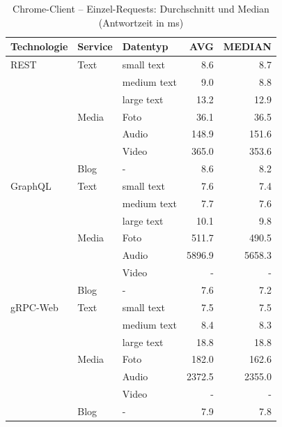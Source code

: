 \begin{table}[h]
	\centering
	\caption{Chrome-Client – Einzel-Requests: Durchschnitt und Median (Antwortzeit in ms)}
	\label{tab:chrome-single-avg}
	\renewcommand{\arraystretch}{1.1}
	\begin{tabular}{|l|l|l|r|r|}
		\hline
		\textbf{Technologie} & \textbf{Service} & \textbf{Datentyp} & \textbf{AVG} & \textbf{MEDIAN} \\
		\hline
		REST & Text  & small text  & 8.6 & 8.7 \\
		&       & medium text & 9.0 & 8.8 \\
		&       & large text  & 13.2 & 12.9 \\
		& Media & Foto        & 36.1 & 36.5 \\
		&       & Audio       & 148.9 & 151.6 \\
		&       & Video       & 365.0 & 353.6 \\
		& Blog  & -           & 8.6 & 8.2 \\
		\hline
		GraphQL & Text  & small text  & 7.6 & 7.4 \\
		&       & medium text & 7.7 & 7.6 \\
		&       & large text  & 10.1 & 9.8 \\
		& Media & Foto        & 511.7 & 490.5 \\
		&       & Audio       & 5896.9 & 5658.3 \\
		&       & Video       & - & - \\
		& Blog  & -           & 7.6 & 7.2 \\
		\hline
		gRPC-Web & Text  & small text  & 7.5 & 7.5 \\
		&       & medium text & 8.4 & 8.3 \\
		&       & large text  & 18.8 & 18.8 \\
		& Media & Foto        & 182.0 & 162.6 \\
		&       & Audio       & 2372.5 & 2355.0 \\
		&       & Video       & - & - \\
		& Blog  & -           & 7.9 & 7.8 \\
		\hline
	\end{tabular}
\end{table}

\clearpage


